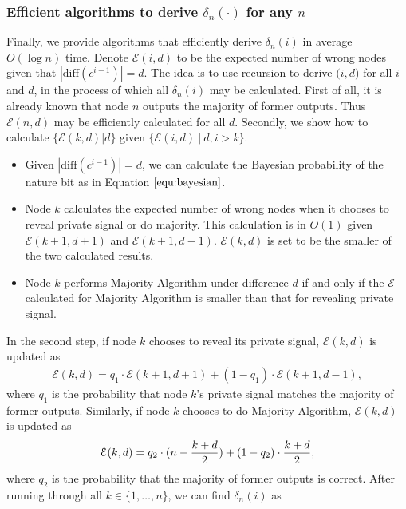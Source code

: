 \documentclass[a4paper,UKenglish]{lipics}
\theoremstyle{definition}
\newcommand{\diff}{\text{diff}}
\begin{document}
\subsubsection{Efficient algorithms to derive $\delta_n(\cdot)$ for any $n$}
Finally, we provide algorithms that efficiently derive $\delta_n(i)$ in average $O(\log n)$ time. 
Denote $\mathcal{E}(i,d)$ to be the expected number of wrong nodes given that $|\diff(c^{i-1})| = d$. 
The idea is to use recursion to derive $\mathcal(i,d)$ for all $i$ and $d$, in the process of which all $\delta_n(i)$ may be calculated.
First of all, it is already known that node $n$ outputs the majority of former outputs.
Thus $\mathcal{E}(n,d)$ may be efficiently calculated for all $d$.
Secondly, we show how to calculate $\{\mathcal{E}(k,d)|d\}$ given $\{\mathcal{E}(i,d)~|~d, i > k\}$.
\begin{itemize}
\item Given $|\diff(c^{i-1})| = d$, we can calculate the Bayesian probability of the nature bit as in Equation $\ref{equ:bayesian}$.
\item Node $k$ calculates the expected number of wrong nodes when it chooses to reveal private signal or do majority. 
	This calculation is in $O(1)$ given $\mathcal{E}(k+1,d+1)$ and $\mathcal{E}(k+1,d-1)$.
	$\mathcal{E}(k,d)$ is set to be the smaller of the two calculated results. 
\item Node $k$ performs Majority Algorithm under difference $d$ if and only if the $\mathcal{E}$ calculated for Majority Algorithm is smaller than that for revealing private signal.
\end{itemize}
In the second step, if node $k$ chooses to reveal its private signal, $\mathcal{E}(k, d)$ is updated as
\begin{equation} 
\label{equ:revealupdate}
\begin{aligned}
	\mathcal{E}(k,d) 
= 
 	q_1\cdot \mathcal{E}(k+1, d+1) + (1-q_1)\cdot \mathcal{E}(k+1, d-1),
\end{aligned}
\end{equation}
where $q_1$ is the probability that node $k$'s private signal matches the majority of former outputs.
Similarly, if node $k$ chooses to do Majority Algorithm, $\mathcal{E}(k, d)$ is updated as
\begin{equation}
\label{equ:majorityupdate}
	\mathcal{E}(k,d) 
= 
	q_2\cdot (n - {k+d\over 2}) + (1-q_2)\cdot {k+d\over 2},
\end{equation}
where $q_2$ is the probability that the majority of former outputs is correct.
After running through all $k\in \{1, \dots, n\}$, we can find $\delta_n(i)$ as
\end{document}
